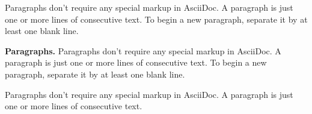 Paragraphs don’t require any special markup in AsciiDoc.
A paragraph is just one or more lines of consecutive text.
To begin a new paragraph, separate it by at least one blank line.

{\bf Paragraphs.}
Paragraphs don’t require any special markup in AsciiDoc.
A paragraph is just one or more lines of consecutive text.
To begin a new paragraph, separate it by at least one blank line.

Paragraphs don’t require any special markup in AsciiDoc.
A paragraph is just one or more lines of consecutive text.
